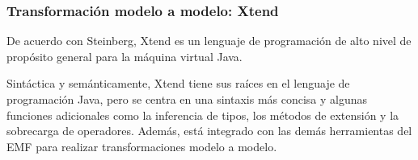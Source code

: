 \subsubsection*{Transformación modelo a modelo: Xtend}\label{sec:xtend}
De acuerdo con Steinberg\cite{steinberg_emf_2008}, Xtend es un lenguaje de programación de alto nivel de propósito general para la máquina virtual Java.


Sintáctica y semánticamente, Xtend tiene sus raíces en el lenguaje de programación Java, pero se centra en una sintaxis más concisa y algunas funciones adicionales como la inferencia de tipos, los métodos de extensión y la sobrecarga de operadores. Además, está integrado con las demás herramientas del EMF para realizar transformaciones modelo a modelo.


